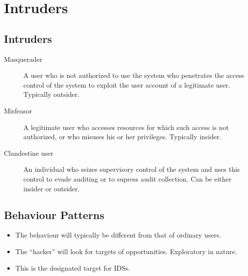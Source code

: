 \mode*




\section{Intruders}

\subsection{Intruders}

\begin{frame}
  \begin{description}
    \item[Masquerader] A user who is not authorized to use the system who 
      penetrates the access control of the system to exploit the user account 
      of a legitimate user.
      Typically outsider.

    \item[Misfeasor] A legitimate user who accesses resources for which such 
      access is not authorized, or who misuses his or her privileges.
      Typically insider.

    \item[Clandestine user] An individual who seizes supervisory control of the 
      system and uses this control to evade auditing or to supress audit 
      collection.
      Can be either insider or outsider.

  \end{description}
\end{frame}

\subsection{Behaviour Patterns}

\begin{frame}
  \begin{itemize}
    \item The behaviour will typically be different from that of ordinary 
      users.

    \item The ``hacker'' will look for targets of opportunities.
      Exploratory in nature.

    \item This is the designated target for IDSs.
  \end{itemize}
\end{frame}

